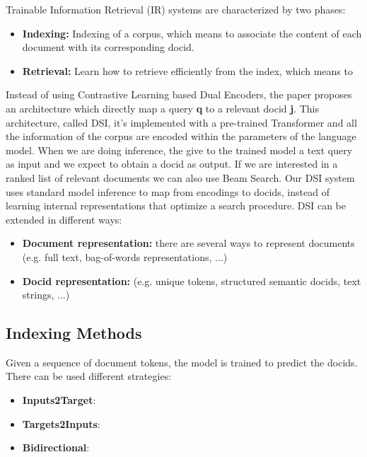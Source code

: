 Trainable Information Retrieval (IR) systems are characterized by two phases:
\begin{itemize}
  \item \textbf{Indexing: }Indexing of a corpus, which means to associate the content of each document with its corresponding docid.
  \item \textbf{Retrieval: }Learn how to retrieve efficiently from the index, which means to 
\end{itemize}
Instead of using Contrastive Learning based Dual Encoders, the paper proposes an architecture which directly map a query \textbf{q} to a relevant docid \textbf{j}. This architecture, called DSI, it's implemented with a pre-trained Transformer and all the information of the corpus are encoded within the parameters of the language model. When we are doing inference, the give to the trained model a text query as input and we expect to obtain a docid as output. If we are interested in a ranked list of relevant documents we can also use Beam Search. Our DSI system uses standard model inference to map from encodings to docids, instead of learning internal representations that optimize a search procedure. DSI can be extended in different ways:
\begin{itemize}
  \item \textbf{Document representation: }there are several ways to represent documents (e.g. full text, bag-of-words representations, ...)
  \item \textbf{Docid representation: }(e.g. unique tokens, structured semantic docids, text strings, ...)
\end{itemize}

\subsection{Indexing Methods}
Given a sequence of document tokens, the model is trained to predict the docids. There can be used different strategies:
\begin{itemize}
  \item \textbf{Inputs2Target}: 
  \item \textbf{Targets2Inputs}:
  \item \textbf{Bidirectional}: 
\end{itemize}